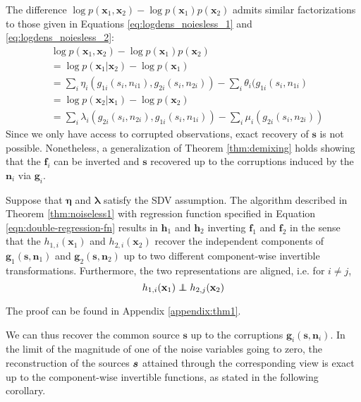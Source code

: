 The difference $\log p(\bm{x}_1, \bm{x}_2) - \log p(\bm{x}_1)p(\bm{x}_2)$ admits similar factorizations to those given in Equations \ref{eq:logdens_noiesless_1} and \ref{eq:logdens_noiesless_2}:
\begin{align}
&\log p(\bm{x}_1, \bm{x}_2) - \log p(\bm{x}_1) p(\bm{x}_2) \nonumber\\
&= \log p(\bm{x}_1 | \bm{x}_2) - \log p(\bm{x}_1)\nonumber\\
&= \sum_i \eta_i(g_{1i}(s_i, n_{i1}), g_{2i}(s_i, n_{2i})) - \sum_i \theta_i(g_{1i}(s_i, n_{1i}) \label{eq:noisylogdens_1}\\
&= \log p(\bm{x}_2 | \bm{x}_1) - \log p(\bm{x}_2) \nonumber\\
&= \sum_i \lambda_i(g_{2i}(s_i, n_{2i}), g_{1i}(s_i, n_{1i})) - \sum_i \mu_i(g_{2i}(s_i, n_{2i})) \label{eq:noisylogdens_2}
\end{align}
Since we only have access to corrupted observations, exact recovery of $\bm{s}$ is not possible.
Nonetheless, a generalization of Theorem \ref{thm:demixing} holds showing that the $\bm{f}_i$ can be inverted and $\bm{s}$ recovered up to the corruptions induced by the $\bm{n}_i$ via $\bm{g}_i$.

\medskip

\begin{theorem}\label{thm:two-noisy-views}
	Suppose that $\bm{\eta}$ and $\bm{\lambda}$ satisfy the SDV assumption.
	The algorithm described in Theorem \ref{thm:noiseless1} with regression function specified in Equation \ref{eqn:double-regression-fn} results in $\bm{h}_1$ and $\bm{h}_2$ inverting $\bm{f}_1$ and $\bm{f}_2$ in the sense that the $h_{1,i}(\bm{x}_1)$ and $h_{2,i}(\bm{x}_2)$ recover the independent components of $\bm{g}_1(\bm{s}, \bm{n}_1)$ and $\bm{g}_2(\bm{s}, \bm{n}_2)$ up to two different component-wise invertible transformations. Furthermore, the two representations are aligned, i.e. for $i\not=j$,
	\begin{equation*}
	h_{1,i}(\mathbf{x}_{1})\independent h_{2,j}(\mathbf{x}_{2})
	\end{equation*}
\end{theorem}
The proof can be found in Appendix \ref{appendix:thm1}.




We can thus recover the common source $\bm{s}$ up to the corruptions $\bm{g}_i(\bm{s}, \bm{n}_i)$.
In the limit of the magnitude of one of the noise variables going to zero, the reconstruction of the sources ${\bm{s}}$ attained through the corresponding view is exact up to the component-wise invertible functions, as stated in the following corollary.

